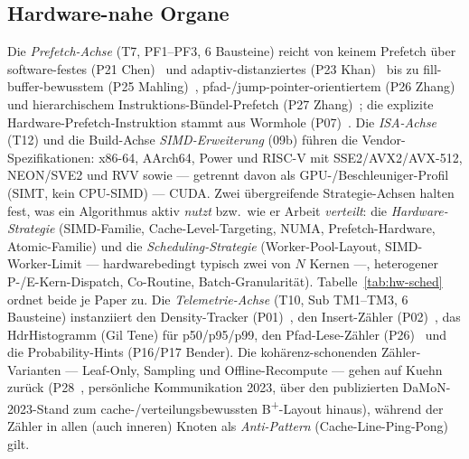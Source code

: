 \subsection{Hardware-nahe Organe}\label{ssec:sota-ax-hw}
Die \emph{Prefetch-Achse} (T7, PF1--PF3, 6 Bausteine) reicht von keinem Prefetch über
software-festes (P21 Chen)~\cite{chen2001prefetch} und adaptiv-distanziertes (P23
Khan)~\cite{khan2010adaptive} bis zu fill-buffer-bewusstem (P25 Mahling)~\cite{mahling2025hotpath},
pfad-/jump-pointer-orientiertem (P26 Zhang)~\cite{zhang2024pathprefix} und hierarchischem
Instruktions-Bündel-Prefetch (P27 Zhang)~\cite{zhang2025hierarchical}; die explizite
Hardware-Prefetch-Instruktion stammt aus Wormhole (P07)~\cite{wu2019wormhole}. Die \emph{ISA-Achse}
(T12) und die Build-Achse \emph{SIMD-Erweiterung} (09b) führen die Vendor-Spezifikationen: x86-64,
AArch64, Power und RISC-V mit SSE2/AVX2/AVX-512, NEON/SVE2 und RVV sowie --- getrennt davon als
GPU-/Beschleuniger-Profil (SIMT, kein CPU-SIMD) --- CUDA\@. Zwei übergreifende Strategie-Achsen halten
fest, was ein Algorithmus aktiv \emph{nutzt} bzw.\ wie er Arbeit \emph{verteilt}: die
\emph{Hardware-Strategie} (SIMD-Familie, Cache-Level-Targeting, NUMA,
Prefetch-Hardware, Atomic-Familie) und die \emph{Scheduling-Strategie} (Worker-Pool-Layout,
SIMD-Worker-Limit --- hardwarebedingt typisch zwei von $N$ Kernen ---,
heterogener P-/E-Kern-Dispatch, Co-Routine, Batch-Granularität).
Tabelle~\ref{tab:hw-sched} ordnet beide je Paper zu. Die \emph{Telemetrie-Achse} (T10, Sub
TM1--TM3, 6 Bausteine) instanziiert den Density-Tracker (P01)~\cite{leis2013art}, den Insert-Zähler
(P02)~\cite{binna2018hot}, das HdrHistogramm (Gil Tene) für p50/p95/p99, den Pfad-Lese-Zähler
(P26)~\cite{zhang2024pathprefix} und die Probability-Hints (P16/P17 Bender). Die kohärenz-schonenden
Zähler-Varianten --- Leaf-Only, Sampling und Offline-Recompute --- gehen auf Kuehn zurück
(P28~\cite{kuehn2023bplustree}, persönliche Kommunikation 2023, über den publizierten
DaMoN-2023-Stand zum cache-/verteilungsbewussten B\textsuperscript{+}-Layout hinaus), während der
Zähler in allen (auch inneren) Knoten als \emph{Anti-Pattern} (Cache-Line-Ping-Pong) gilt.

